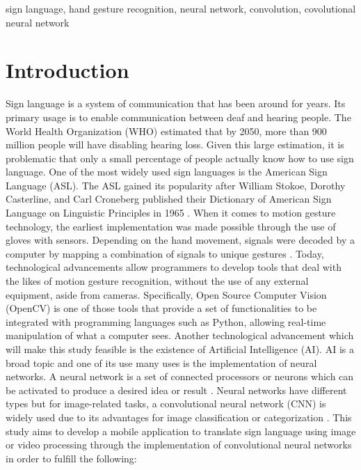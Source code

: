 \documentclass[journal]{./IEEE/IEEEtran}
\title{\SPTITLE}
\author{\ADVISEE~and~\ADVISER%
\REMARK
}
\begin{document}
\maketitle


\begin{keywords}
sign language, hand gesture recognition, neural network, convolution, covolutional neural network
\end{keywords}

\section{Introduction}
Sign language is a system of communication that has been around for years. Its primary usage is to enable communication between deaf and hearing people. The World Health Organization (WHO) \cite{WHO2018} estimated that by 2050, more than 900 million people will have disabling hearing loss. Given this large estimation, it is problematic that only a small percentage of people actually know how to use sign language. One of the most widely used sign languages is the American Sign Language (ASL). The ASL gained its popularity after William Stokoe, Dorothy Casterline, and Carl Croneberg published their Dictionary of American Sign Language on Linguistic Principles in 1965 \cite{Wilcox1991}.
\newline
\indent When it comes to motion gesture technology, the earliest implementation was made possible through the use of gloves with sensors. Depending on the hand movement, signals were decoded by a computer by mapping a combination of signals to unique gestures \cite{Sharma2015}.  Today, technological advancements allow programmers to develop tools that deal with the likes of motion gesture recognition, without the use of any external equipment, aside from cameras. Specifically, Open Source Computer Vision (OpenCV) is one of those tools that provide a set of functionalities to be integrated with programming languages such as Python, allowing real-time manipulation of what a computer sees.
\newline
\indent Another technological advancement which will make this study feasible is the existence of Artificial Intelligence (AI). AI is a broad topic and one of its use many uses is the implementation of neural networks. A neural network is a set of connected processors or neurons which can be activated to produce a desired idea or result \cite{Schmidhuber2015}. Neural networks have different types but for image-related tasks, a convolutional neural network (CNN) is widely used due to its advantages for image classification or categorization \cite{Wu2016}.
\newline
\indent This study aims to develop a mobile application to translate sign language using image or video processing through the implementation of convolutional neural networks in order to fulfill the following:
\end{document}

